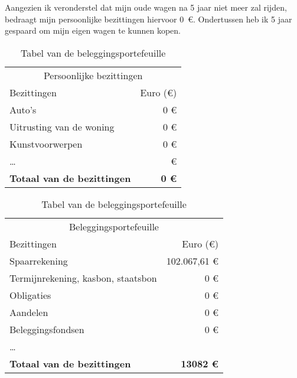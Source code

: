 Aangezien ik veronderstel dat mijn oude wagen na 5 jaar niet meer zal rijden, bedraagt mijn persoonlijke bezittingen hiervoor 0~\euro{}. Ondertussen heb ik 5 jaar gespaard om mijn eigen wagen te kunnen kopen.


\begin{table}[ht]
	\begin{minipage}[b]{9cm}\centering
		\begin{tabular}{@{}lr@{}}
			\toprule
			\multicolumn{2}{c}{Persoonlijke bezittingen}       \\
			\cmidrule(r){1-2}
			Bezittingen   &     Euro (\euro{}) \\ \midrule
			Auto's                             &          0 \euro{} \\
			Uitrusting van de woning           &          0 \euro{} \\
			Kunstvoorwerpen                    &          0 \euro{} \\
			\dots                              &            \euro{} \\ \toprule
			\textbf{Totaal van de bezittingen} & \textbf{0 \euro{}} \\ \bottomrule
		\end{tabular}
		\caption{Tabel van de onroerende en zakelijke bezittingen}
		\label{tab:tabelonroerendeenzakelijkebezittingen}
		
		
	\end{minipage}
	\hspace{0.5cm}
	\begin{minipage}[b]{9cm}\centering
		\begin{tabular}{@{}lr@{}}
			\toprule
			\multicolumn{2}{c}{Beleggingsportefeuille}        \\
			\cmidrule(r){1-2}
			Bezittingen   &      Euro (\euro{}) \\ \midrule
			
			Spaarrekening                      &           102.067,61 \euro{} \\
			Termijnrekening, kasbon, staatsbon &           0 \euro{} \\
			Obligaties                         &           0 \euro{} \\
			Aandelen                           &           0 \euro{} \\
			Beleggingsfondsen                  &           0 \euro{} \\
			\dots                              &  \\ \toprule
			\textbf{Totaal van de bezittingen} & \textbf{13082 \euro{}} \\ \bottomrule
		\end{tabular}
		\caption{Tabel van de beleggingsportefeuille}
		\label{tab:tabelbeleggingsportefeuille}
	\end{minipage}
\end{table}
